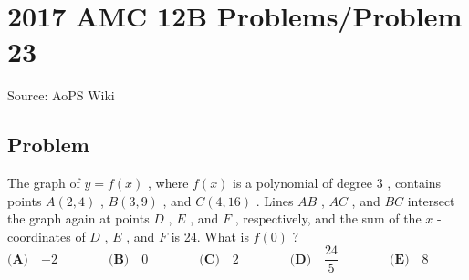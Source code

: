 \documentclass[12pt]{article}
\begin{document}
\section*{{2017 AMC 12B Problems/Problem 23}}
Source: AoPS Wiki

\subsection*{Problem}
The graph of $y=f(x)$ , where $f(x)$ is a polynomial of degree $3$ , contains points $A(2,4)$ , $B(3,9)$ , and $C(4,16)$ . Lines $AB$ , $AC$ , and $BC$ intersect the graph again at points $D$ , $E$ , and $F$ , respectively, and the sum of the $x$ -coordinates of $D$ , $E$ , and $F$ is 24. What is $f(0)$ ? $\textbf{(A)}\quad {-2} \qquad \qquad \textbf{(B)}\quad 0 \qquad\qquad \textbf{(C)}\quad 2 \qquad\qquad \textbf{(D)}\quad \dfrac{24}5 \qquad\qquad\textbf{(E)}\quad 8$
\end{document}
